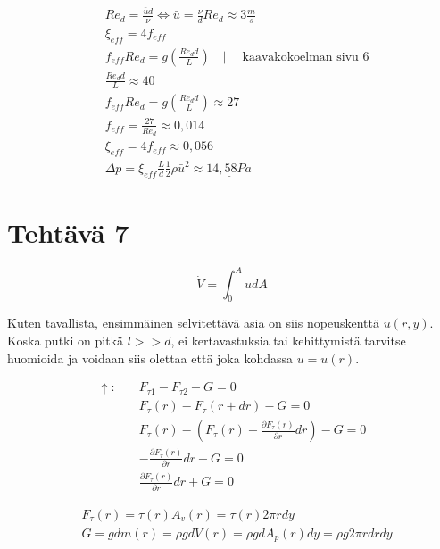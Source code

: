 \documentclass[12pt,a4paper,finnish]{article}
\begin{document}
\begin{align}
 &Re_d = \frac{\bar{u}d}{\nu} \Leftrightarrow \bar{u} = \frac{\nu}{d}Re_d \approx 3 \frac{m}{s}\\
 &\xi_{eff} = 4f_{eff}\\
 &f_{eff}Re_d = g\left(\frac{Re_dd}{L}\right) \quad \bigg|\bigg| \quad 
  \text{kaavakokoelman sivu 6}\\
 &\frac{Re_dd}{L} \approx 40\\
 &f_{eff}Re_d = g\left(\frac{Re_dd}{L}\right) \approx 27\\
 &f_{eff} = \frac{27}{Re_d} \approx 0,014\\
 &\xi_{eff} = 4f_{eff} \approx 0,056\\
 &\Delta p = \xi_{eff}\frac{L}{d}\frac{1}{2}\rho \bar{u}^2 \approx \underline{14,58 Pa}
\end{align}

\section{Tehtävä 7}

\begin{equation}
 \dot{V} = \int_0^AudA
\end{equation}

Kuten tavallista, ensimmäinen selvitettävä asia on siis nopeuskenttä $u(r, y)$. Koska 
putki on pitkä $l >>d$, ei kertavastuksia tai kehittymistä tarvitse huomioida ja voidaan 
siis olettaa että joka kohdassa $u = u(r)$.

\begin{align}
 \uparrow: \quad &F_{\tau 1} - F_{\tau 2} - G = 0\\
 &F_{\tau}(r) - F_{\tau}(r + dr) - G = 0\\
 &F_{\tau}(r) - \left(F_{\tau}(r) + \frac{\partial F_{\tau}(r)}{\partial r}dr\right) - G = 0\\
 &- \frac{\partial F_{\tau}(r)}{\partial r}dr - G = 0\\
 &\frac{\partial F_{\tau}(r)}{\partial r}dr + G = 0
\end{align}

\begin{align}
 &F_{\tau}(r) = \tau(r)A_v(r) = \tau(r)2\pi rdy\\
 &G = gdm(r) = \rho g dV(r) = \rho g dA_p(r)dy = \rho g 2\pi r drdy
\end{align}
\end{document}
